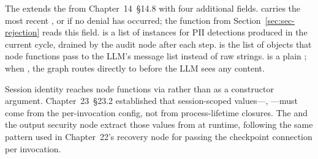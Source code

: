 The  extends the  from
Chapter~14~\S14.8 with four additional fields.
 carries the most recent ,
or  if no denial has occurred; the
 function from
Section~\ref{sec:sec-rejection} reads this field.
 is a list of  instances
for PII detections produced in the current cycle, drained by the audit
node after each step.  is the list of
 objects that node functions pass to the LLM's
message list instead of raw strings.  is a
plain ; when , the graph routes directly to
 before the LLM sees any content.

Session identity reaches node functions via 
rather than as a constructor argument. Chapter~23~\S23.2 established
that session-scoped values---, ---must
come from the per-invocation config, not from process-lifetime closures.
The  and the output security node
extract those values from  at
runtime, following the same pattern used in Chapter~22's recovery node
for passing the checkpoint connection per invocation.

